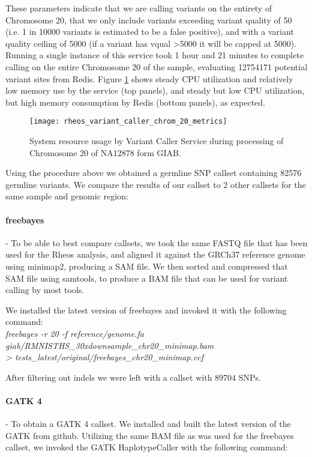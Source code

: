 These parameters indicate that we are calling variants on the entirety of Chromosome 20, that we only include variants exceeding variant quality of 50 (i.e. 1 in 10000 variants is estimated to be a false positive), and with a variant quality ceiling of 5000 (if a variant has vqual >5000 it will be capped at 5000). Running a single instance of this service took 1 hour and 21 minutes to complete calling on the entire Chromosome 20 of the sample, evaluating 12754171 potential variant sites from Redis. Figure \ref{fig:rheos_variant_caller_chrom20_metrics} shows steady CPU utilization and relatively low memory use by the service (top panels), and steady but low CPU utilization, but high memory consumption by Redis (bottom panels), as expected.

\begin{figure}[h!]
    \texttt{[image: rheos\_variant\_caller\_chrom\_20\_metrics]}
    \centering
    \caption {System resource usage by Variant Caller Service during processing of Chromosome 20 of NA12878 form GIAB.}
    \label{fig:rheos_variant_caller_chrom20_metrics}
\end{figure}

Using the procedure above we obtained a germline SNP callset containing 82576 germline variants. We compare the results of our callset to 2 other callsets for the same sample and genomic region:

\paragraph{freebayes} - To be able to best compare callsets, we took the same FASTQ file that has been used for the Rheos analysis, and aligned it against the GRCh37 reference genome using minimap2, producing a SAM file. We then sorted and compressed that SAM file using samtools, to produce a BAM file that can be used for variant calling by most tools.

We installed the latest version of freebayes\autocite{garrison2012haplotype} and invoked it with the following command:
\\
\emph{freebayes -r 20 -f reference/genome.fa \\
giab/RMNISTHS\_30xdownsample\_chr20\_minimap.bam\\
 > tests\_latest/original/freebayes\_chr20\_minimap.vcf}

After filtering out indels we were left with a callset with 89704 SNPs.
\newpage
\paragraph{GATK 4} - To obtain a GATK 4 callset. We installed and built the latest version of the GATK\autocite{mckenna2010genome} from github. Utilizing the same BAM file as was used for the freebayes callset, we invoked the GATK HaplotypeCaller with the following command:

